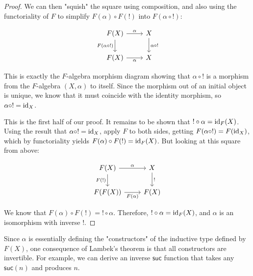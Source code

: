\begin{proof}
  We can then "squish" the square using composition, and also using the functoriality of $F$ to simplify $F(\alpha) \circ F(!)$ into $F(\alpha \circ !)$:

    \[\begin{tikzcd}
        {F(X)} & X \\
        {F(X)} & X
        \arrow["\alpha", from=1-1, to=1-2]
        \arrow["{F(\alpha \circ !)}"', from=1-1, to=2-1]
        \arrow["{\alpha \circ !}", from=1-2, to=2-2]
        \arrow["\alpha"', from=2-1, to=2-2]
    \end{tikzcd}\]

  This is exactly the $F$-algebra morphism diagram showing that $\alpha \circ !$ is a morphism from the $F$-algebra $(X, \alpha)$ to itself.
  Since the morphism out of an initial object is unique, we know that it must coincide with the identity morphism, so $\alpha \circ ! = \operatorname{id}_X$.
  
  This is the first half of our proof.
  It remains to be shown that $! \circ \alpha = \operatorname{id}_F(X)$.
  Using the result that $\alpha \circ ! = \operatorname{id}_X$, apply $F$ to both sides, getting $F(\alpha \circ !) = F(\operatorname{id}_X)$, which by functoriality yields $F(\alpha) \circ F(!) = \operatorname{id}_F(X)$.
  But looking at this square from above:

    \[\begin{tikzcd}
        {F(X)} & X \\
        {F(F(X))} & {F(X)}
        \arrow["\alpha", from=1-1, to=1-2]
        \arrow["{F(!)}"', from=1-1, to=2-1]
        \arrow["{!}", from=1-2, to=2-2]
        \arrow["{F(\alpha)}"', from=2-1, to=2-2]
    \end{tikzcd}\]

  We know that $F(\alpha) \circ F(!) = ! \circ \alpha$.
  Therefore, $! \circ \alpha = \operatorname{id}_F(X)$, and $\alpha$ is an isomorphism with inverse $!$.
\end{proof}

Since $\alpha$ is essentially defining the "constructors" of the inductive type defined by $F(X)$, one consequence of Lambek's theorem is that all constructors are invertible.
For example, we can derive an inverse $\mathsf{suc}$ function that takes any $\mathsf{suc}(n)$ and produces $n$.

